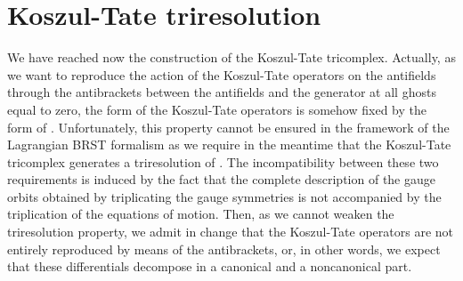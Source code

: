 \documentclass[a4paper,12pt]{article}
\begin{document}
\section{Koszul-Tate triresolution}

We have reached now the construction of the Koszul-Tate tricomplex.
Actually, as we want to reproduce the action of the Koszul-Tate operators on
the antifields through the antibrackets between the antifields and the
generator \coordHE{} at all ghosts equal to zero, the form of the Koszul-Tate
operators is somehow fixed by the form of \coordHE{}. Unfortunately, this property
cannot be ensured in the framework of the Lagrangian \coordHE{} BRST formalism
as we require in the meantime that the Koszul-Tate tricomplex generates a
triresolution of \coordHE{}. The incompatibility
between these two requirements is induced by the fact that the complete
description of the gauge orbits obtained by triplicating the gauge
symmetries is not accompanied by the triplication of the equations of
motion. Then, as we cannot weaken the triresolution property, we admit in
change that the Koszul-Tate operators are not entirely reproduced by means
of the antibrackets, or, in other words, we expect that these differentials
decompose in a canonical and a noncanonical part.
\end{document}
